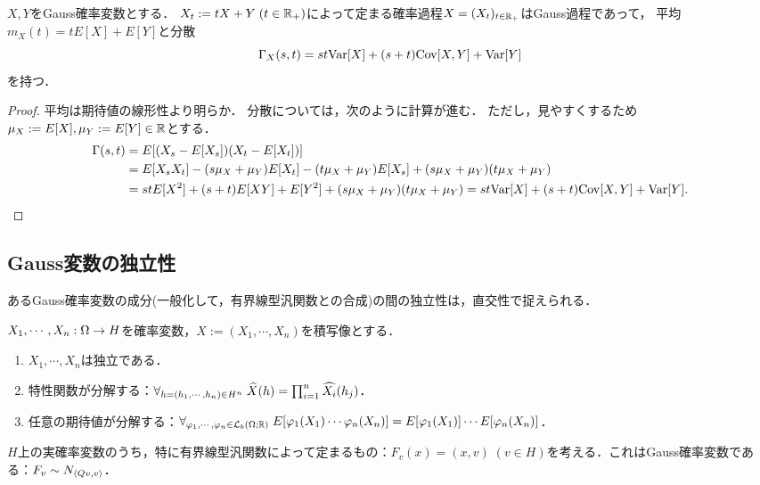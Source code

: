 \documentclass[uplatex,dvipdfmx]{jsreport}
\begin{document}
\begin{lemma}[共分散公式]
    $X,Y$をGauss確率変数とする．
    $X_t:=tX+Y\;(t\in\mathbb{R}_+)$によって定まる確率過程$X=(X_t)_{t\in\mathbb{R}_+}$はGauss過程であって，
    平均$m_X(t)=tE[X]+E[Y]$と分散
    \[\Gamma_X(s,t)=st\mathrm{Var}[X]+(s+t)\mathrm{Cov}[X,Y]+\mathrm{Var}[Y]\]
    を持つ．
\end{lemma}
\begin{proof}
    平均は期待値の線形性より明らか．
    分散については，次のように計算が進む．
    ただし，見やすくするため$\mu_X:=E[X],\mu_Y:=E[Y]\in\mathbb{R}$とする．
    \begin{align*}
        \Gamma(s,t)&=E[(X_s-E[X_s])(X_t-E[X_t])]\\
        &=E[X_sX_t]-(s\mu_X+\mu_Y)E[X_t]-(t\mu_X+\mu_Y)E[X_s]+(s\mu_X+\mu_Y)(t\mu_X+\mu_Y)\\
        &=stE[X^2]+(s+t)E[XY]+E[Y^2]+(s\mu_X+\mu_Y)(t\mu_X+\mu_Y)=st\mathrm{Var}[X]+(s+t)\mathrm{Cov}[X,Y]+\mathrm{Var}[Y].
    \end{align*}
\end{proof}

\subsection{Gauss変数の独立性}

\begin{tcolorbox}[colframe=ForestGreen, colback=ForestGreen!10!white,breakable,colbacktitle=ForestGreen!40!white,coltitle=black,fonttitle=\bfseries\sffamily,
title=]
    あるGauss確率変数の成分(一般化して，有界線型汎関数との合成)の間の独立性は，直交性で捉えられる．
\end{tcolorbox}

\begin{proposition}[一般の確率変数の独立性の特徴付け]
    $X_1,\cdots,X_n:\Omega\to H$を確率変数，$X:=(X_1,\cdots,X_n)$を積写像とする．
    \begin{enumerate}
        \item $X_1,\cdots,X_n$は独立である．
        \item 特性関数が分解する：$\forall_{h=(h_1,\cdots,h_n)\in H^n}\;\widehat{X}(h)=\prod_{i=1}^n\widehat{X_i}(h_j)$．
        \item 任意の期待値が分解する：$\forall_{\varphi_1,\cdots,\varphi_n\in\mathcal{L}_b(\Omega;\mathbb{R})}\;E[\varphi_1(X_1)\cdots\varphi_n(X_n)]=E[\varphi_1(X_1)]\cdots E[\varphi_n(X_n)]$．
    \end{enumerate}
\end{proposition}

\begin{notation}[正規Hilbert空間上の線型な実確率変数]
    $H$上の実確率変数のうち，特に有界線型汎関数によって定まるもの：$F_v(x)=(x,v)\;(v\in H)$を考える．これはGauss確率変数である：$F_v\sim N_{\langle Qv,v\rangle}$．
\end{notation}
\end{document}
